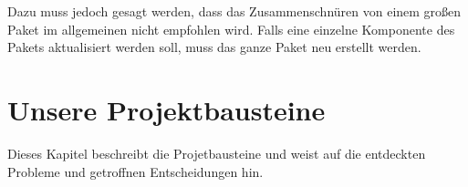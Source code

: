 Dazu muss jedoch gesagt werden, dass das Zusammenschnüren von einem großen Paket im allgemeinen nicht empfohlen wird.
Falls eine einzelne Komponente des Pakets aktualisiert werden soll, muss das ganze Paket neu erstellt werden. 

\section{Unsere Projektbausteine}
\label{sec:projektbausteine}
Dieses Kapitel beschreibt die Projetbausteine und weist auf die entdeckten Probleme und getroffnen Entscheidungen hin.
